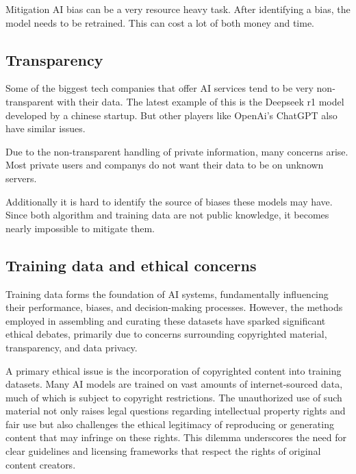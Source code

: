 Mitigation AI bias can be a very resource heavy task. After identifying a bias, the model needs to be retrained. This can cost a lot of both money and time. 

\cite{AiDataBias}

\subsection{Transparency}
\label{subsec:transparence}

Some of the biggest tech companies that offer AI services tend to be very non-transparent with their data. 
The latest example of this is the Deepseek r1 model developed by a chinese startup. But other players like OpenAi's ChatGPT also have similar issues.

Due to the non-transparent handling of private information, many concerns arise. Most private users and companys do not want their data to be on unknown servers.

Additionally it is hard to identify the source of biases these models may have. Since both algorithm and training data are not public knowledge, it becomes nearly impossible to mitigate them.

\cite{AiTransparancy}

\subsection{Training data and ethical concerns}
\label{subsec:training-data-and-ethical-concerns}

Training data forms the foundation of AI systems, fundamentally influencing their performance, biases, and decision-making processes. However, the methods employed in assembling and curating these datasets have sparked significant ethical debates, primarily due to concerns surrounding copyrighted material, transparency, and data privacy.

A primary ethical issue is the incorporation of copyrighted content into training datasets. Many AI models are trained on vast amounts of internet-sourced data, much of which is subject to copyright restrictions. The unauthorized use of such material not only raises legal questions regarding intellectual property rights and fair use but also challenges the ethical legitimacy of reproducing or generating content that may infringe on these rights. This dilemma underscores the need for clear guidelines and licensing frameworks that respect the rights of original content creators.

